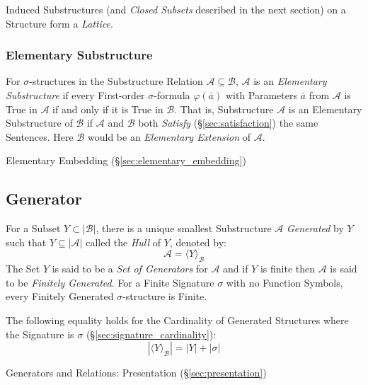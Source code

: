 Induced Substructures (and \emph{Closed Subsets} described in the next
section) on a Structure form a \emph{Lattice}.



\subsubsection{Elementary Substructure}
\label{sec:elementary_substructure}

For $\sigma$-structures in the Substructure Relation $\mathcal{A}
\subseteq \mathcal{B}$, $\mathcal{A}$ is an \emph{Elementary
  Substructure} if every First-order $\sigma$-formula
$\varphi(\bar{a})$ with Parameters $\bar{a}$ from $\mathcal{A}$ is
True in $\mathcal{A}$ if and only if it is True in $\mathcal{B}$. That
is, Substructure $\mathcal{A}$ is an Elementary Substructure of
$\mathcal{B}$ if $\mathcal{A}$ and $\mathcal{B}$ both \emph{Satisfy}
(\S\ref{sec:satisfaction}) the same Sentences. Here $\mathcal{B}$
would be an \emph{Elementary Extension} of $\mathcal{A}$.

Elementary Embedding (\S\ref{sec:elementary_embedding})



\subsection{Generator}\label{sec:generator}

For a Subset $Y \subset |\mathcal{B}|$, there is a unique smallest
Substructure $\mathcal{A}$ \emph{Generated} by $Y$ such that $Y
\subseteq |\mathcal{A}|$ called the \emph{Hull} of $Y$, denoted by:
\[
  \mathcal{A} = \langle Y \rangle_\mathcal{B}
\]
The Set $Y$ is said to be a \emph{Set of Generators} for $\mathcal{A}$
and if $Y$ is finite then $\mathcal{A}$ is said to be \emph{Finitely
  Generated}. For a Finite Signature $\sigma$ with no Function
Symbols, every Finitely Generated $\sigma$-structure is Finite.

The following equality holds for the Cardinality of Generated
Structures where the Signature is $\sigma$
(\S\ref{sec:signature_cardinality}):
\[
  |\langle Y \rangle_\mathcal{B}| = |Y| + |\sigma|
\]

Generators and Relations: Presentation (\S\ref{sec:presentation})



